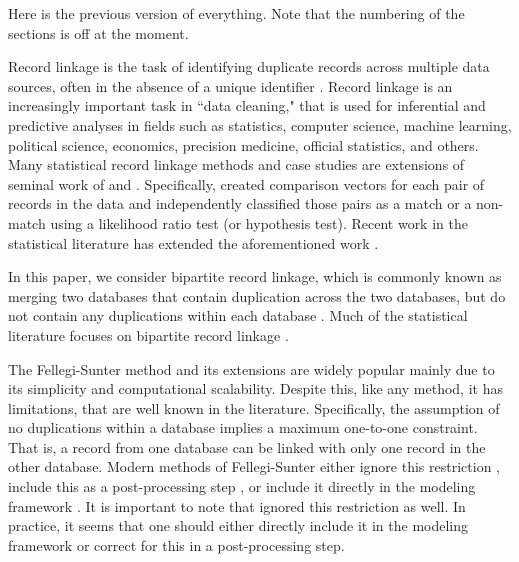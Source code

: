 \documentclass[12pt,letterpaper]{article}
\newcommand{\1}[1]{\mathbb{I}\!\left[#1\right]} %
\begin{document}
\newpage
{
\color{red}
Here is the previous version of everything. Note that the numbering of the sections is off at the moment. 
}



Record linkage is the task of identifying duplicate records across multiple data sources, often in the absence of a unique identifier \citep{christen_2012}. Record linkage is an increasingly important task in ``data cleaning," that is used for inferential and predictive analyses in fields such as statistics, computer science, machine learning, political science, economics, precision medicine, official statistics, and others. Many statistical record linkage methods and case studies are extensions of seminal work of \cite{fellegi_theory_1969} and \cite{newcombe_automatic_1959}. Specifically, \cite{fellegi_theory_1969} created comparison vectors for each pair of records in the data and independently classified those pairs as a match or a non-match using a likelihood ratio test (or hypothesis test). Recent work in the statistical literature has extended the aforementioned work \citep{winkler1991application, fair2004generalized, wagner2014person, gill2003english}. 


In this paper, we consider bipartite record linkage, which is commonly known as merging two databases that contain duplication across the two databases, but do not contain any duplications within each database \citep{sadinle_bayesian_2017}. Much of the statistical literature focuses on bipartite record linkage \citep{fellegi_theory_1969, jaro1989, Winkler1988, belin_1995, larsen_2001, liseo_2011,  herzog2007data, gutman_bayesian_2013, sadinle_bayesian_2017}. 

The Fellegi-Sunter method and its extensions are widely popular mainly due to its simplicity and computational scalability. Despite this, like any method, it has limitations, that are well known in the literature. Specifically, the assumption of no duplications within a database implies a maximum one-to-one constraint. That is, a record from one database can be linked with only one record in the other database. Modern methods of Fellegi-Sunter either ignore this restriction \citep{Winkler1988, belin_1995, larsen_2001}, include this as a post-processing step \citep{jaro1989}, or include it directly in the modeling framework \citep{sadinle_bayesian_2017}. It is important to note that \cite{fellegi_theory_1969} ignored this restriction as well. In practice, it seems that one should either directly include it in the modeling framework or correct for this in a post-processing step. 
\end{document}
